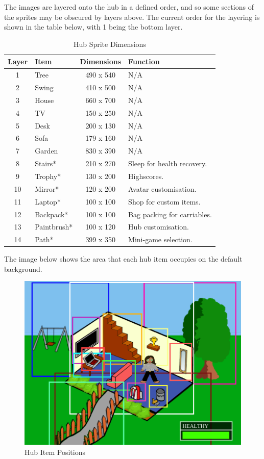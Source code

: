 \documentclass[a4paper,12pt]{article}
\begin{document}
The images are layered onto the hub in a defined order, and so some sections of the sprites may be obscured by layers above. The current order for the layering is shown in the table below, with 1 being the bottom layer.

\begin{table}[H]
	\centering
	\begin{tabular}{|c|l|c|l|}
		\hline
		Layer &	Item  		& Dimensions	& Function \\ \hline
		1 &		Tree		& 490 x 540		& N/A \\
		2 &		Swing		& 410 x 500		& N/A \\
		3 &		House		& 660 x 700		& N/A \\
		4 &		TV			& 150 x 250 	& N/A \\
		5 &		Desk		& 200 x 130		& N/A \\
		6 &		Sofa		& 179 x 160		& N/A \\
		7 &		Garden		& 830 x 390		& N/A \\
		8 &		Stairs*		& 210 x 270		& Sleep for health recovery. \\
		9 &		Trophy*		& 130 x 200		& Highscores. \\
		10 &	Mirror*		& 120 x 200		& Avatar customisation. \\
		11 &	Laptop*		& 100 x 100		& Shop for custom items. \\
		12 &	Backpack*	& 100 x 100		& Bag packing for carriables. \\
		13 &	Paintbrush*	& 100 x 120		& Hub customisation. \\
		14 &	Path*		& 399 x 350		& Mini-game selection. \\ \hline
	\end{tabular}
	\caption{Hub Sprite Dimensions}
	\label{tab:hub_dimensions}
\end{table}

The image below shows the area that each hub item occupies on the default background.

\begin{figure}[H]
	\captionsetup{justification=centering}
	\centering
	\includegraphics[width=0.80\linewidth]{Artist_Guide_Images/hub_outlines}
	\caption{Hub Item Positions}
	\label{fig:hub_outlines}
\end{figure}
\end{document}
